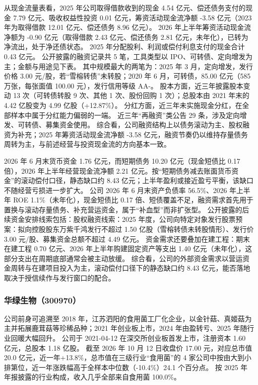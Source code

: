  从现金流量表看，2025 年公司取得借款收到的现金 4.54 亿元、偿还债务支付的现金 7.79 亿元、吸收权益性投资 0.01 亿元，筹资活动现金流净额 -3.58 亿元（2023 年为取得借款 12.01 亿元、偿还债务 8.96 亿元）。 2026 年上半年筹资活动现金流净额为 -0.90 亿元（取得借款 2.43 亿元、偿还债务 2.81 亿元，未年化），已转为净流出，处于净还债状态。 2025 年分配股利、利润或偿付利息支付的现金合计 0.43 亿元。 公开披露的融资记录共 5 笔，工具类型以 IPO、可转债、定向增发为主；金额与用途见下表。 其中规模最大的两笔为：2025 年 3 月，定向增发，发行价格 3.00 元/股，若“雪榕转债”未转股；2020 年 6 月，可转债，85.00 亿元（585 万张，每张面值 100.00 元），发行信用等级 AA-。 股本方面，近三年披露股本变动 13 次（可转债转股 9 次、其他 1 次、股份回购 1 次）；总股本由 2021 年末的 4.42 亿股变为 4.99 亿股（+12.87\%）。 分红方面，近三年未实施现金分红，在全部样本中属于分红能力偏弱的一端。 近三年“再融资”类公告 29 条，涉及定向增发、可转债、募集资金使用。 综合看，公司融资结构上以债务滚动为主、股权融资为补充；2025 年筹资活动现金流净额 -3.58 亿元，融资节奏仍以维持存量债务周转为主，与前述经营与投资现金流的方向基本一致。

 2026 年 6 月末货币资金 1.76 亿元，而短期债务 10.20 亿元（现金短债比 0.17 倍），2026 年上半年经营现金流净额 2.21 亿元。按“短期债务减去账面货币资金”的滚动偿付口径，静态缺口约 8.43 亿元；上半年盈利或接近盈亏平衡，该缺口不随经营亏损进一步扩大。 公司 2026 年 6 月末资产负债率 56.5\%、2026 年上半年 ROE 1.1\%（未年化），现金短债比 0.17 倍、短债覆盖不足，融资需求首先用于置换与滚动存量债务、补充营运资金，属于“补血型”而非扩张型。 公开披露的后续资金安排线索包括：股权融资线索：2025 年度，公司向特定对象发行股票预案：拟向控股股东万紫千鸿发行不超过 1.50 亿股（雪榕转债未转股情形）、发行价 3.00 元/股、募集资金总额不超过 4.49 亿元。 资金需求还要叠加在建工程：期末在建工程 0.70 亿元、2026 年上半年购建固定资产等支出 1.40 亿元（未年化），这部分支出在周期底部通常会被主动放缓。 综合看，公司的外部资金需求以营运资金周转与在建项目投入为主，滚动偿付口径下的静态缺口约 8.43 亿元，能否落地取决于授信续作与发行窗口的配合。




\subsubsection{华绿生物（300970）}
\label{co:300970}

 公司前身可追溯至 2018 年，江苏泗阳的食用菌工厂化企业，以金针菇、真姬菇为主并拓展鹿茸菇等珍稀品种；2021 年创业板上市，2024 年由盈转亏、2025 年随行业回暖大幅回升。 公司于 2021-04-12 在深交所创业板首发上市，注册资本 1.60 亿元，总股本 1.18 亿股。 截至 2026 年 10 月 12 日收盘价 17.00 元，对应总市值 20.0 亿元，近一年+13.8\%，总市值在三级行业“食用菌”的 4 家公司中按由大到小排第位，近一年涨跌幅高于全样本中位数（-10.4\%）24.1 个百分点。 按 2025 年年报披露的行业构成，收入几乎全部来自食用菌 100.0\%。


